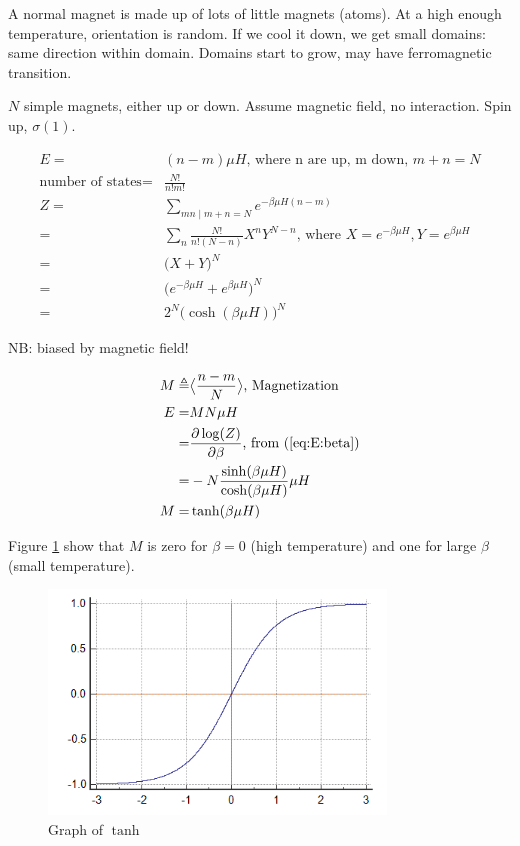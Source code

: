 \documentclass[]{article}
\begin{document}
A normal magnet is made up of lots of little magnets (atoms). At a high enough temperature, orientation is random. If we cool it down, we get small domains: same direction within domain. Domains start to grow, may have ferromagnetic transition.

$N$ simple magnets, either up or down. Assume magnetic field, no interaction. Spin up, $\sigma(1).$

\begin{align*}
E=&(n-m)\mu H\text{, where n are up, m down, $m+n=N$}\\
\text{number of states} =&\frac{N!}{n!m!}\\
Z =&\sum_{mn\mid m+n=N} e^{- \beta \mu H(n-m)}\\
=&\sum_{n}\frac{N!}{n!(N-n)}X^nY^{N-n}\text{, where $X=e^{-\beta\mu H},Y=e^{\beta\mu H}$}\\
=&\big(X+Y\big)^N\tag*{from the Binomial Theorem}\\
=&\big(e^{-\beta\mu H}+e^{\beta\mu H}\big)^N\\
=&2^N \big(\cosh(\beta\mu H)\big)^N\tag*{Definition of cosh}
\end{align*}

NB: biased by magnetic field!

\begin{align*}
	M \triangleq& \big< \frac{n-m}{N}\big>\text{, Magnetization} \\
	E =& M N \mu H\\
	=& \frac{\partial \log(Z)}{\partial \beta} \text{, from (\ref{eq:E:beta})}\\
	=& - N \frac{\sinh(\beta\mu H)}{\cosh(\beta\mu H)} \mu H\\
	M=& \tanh(\beta\mu H)
\end{align*}

Figure \ref{fig:tanh} show that $M$ is zero for $\beta=0$ (high temperature) and one for large $\beta$ (small temperature).

\begin{figure}[H]
	\caption{Graph of $\tanh$}\label{fig:tanh}
	\includegraphics[width=0.8\textwidth]{tanh}
\end{figure}
\end{document}
